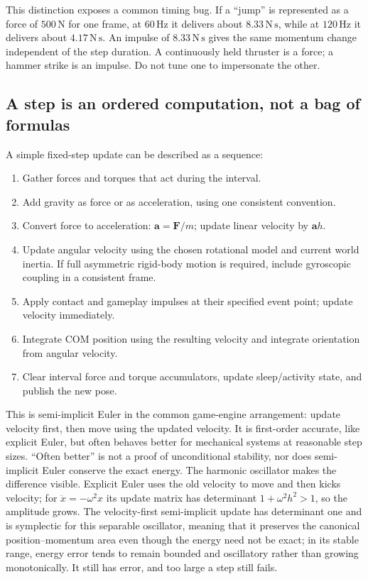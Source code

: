 This distinction exposes a common timing bug. If a ``jump'' is represented as a force of \(500\,\mathrm N\) for one frame, at \(60\,\mathrm{Hz}\) it delivers about \(8.33\,\mathrm{N\,s}\), while at \(120\,\mathrm{Hz}\) it delivers about \(4.17\,\mathrm{N\,s}\). An impulse of \(8.33\,\mathrm{N\,s}\) gives the same momentum change independent of the step duration. A continuously held thruster is a force; a hammer strike is an impulse. Do not tune one to impersonate the other.

\subsection{A step is an ordered computation, not a bag of formulas}\label{06-engine-ii-ch034-a-step-is-an-ordered-computation-not-a-bag-of-formulas}

\hypertarget{06-engine-ii-ch034-a-step-is-an-ordered-computation-not-a-bag-of-formulas}{}

A simple fixed-step update can be described as a sequence:

\begin{enumerate}
\def\labelenumi{\arabic{enumi}.}
\tightlist
\item
  Gather forces and torques that act during the interval.
\item
  Add gravity as force or as acceleration, using one consistent convention.
\item
  Convert force to acceleration: \(\mathbf a=\mathbf F/m\); update linear velocity by \(\mathbf a h\).
\item
  Update angular velocity using the chosen rotational model and current world inertia. If full asymmetric rigid-body motion is required, include gyroscopic coupling in a consistent frame.
\item
  Apply contact and gameplay impulses at their specified event point; update velocity immediately.
\item
  Integrate COM position using the resulting velocity and integrate orientation from angular velocity.
\item
  Clear interval force and torque accumulators, update sleep/activity state, and publish the new pose.
\end{enumerate}

This is semi-implicit Euler in the common game-engine arrangement: update velocity first, then move using the updated velocity. It is first-order accurate, like explicit Euler, but often behaves better for mechanical systems at reasonable step sizes. ``Often better'' is not a proof of unconditional stability, nor does semi-implicit Euler conserve the exact energy. The harmonic oscillator makes the difference visible. Explicit Euler uses the old velocity to move and then kicks velocity; for \(\ddot x=-\omega^2x\) its update matrix has determinant \(1+\omega^2h^2>1\), so the amplitude grows. The velocity-first semi-implicit update has determinant one and is symplectic for this separable oscillator, meaning that it preserves the canonical position--momentum area even though the energy need not be exact; in its stable range, energy error tends to remain bounded and oscillatory rather than growing monotonically. It still has error, and too large a step still fails.

